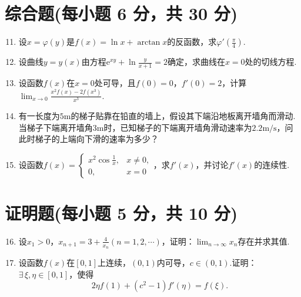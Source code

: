 \documentclass[../main.tex]{subfiles}
\begin{document}
\section{综合题(每小题 6 分，共 30 分)}
\begin{enumerate}
    \setcounter{enumi}{10}
    \item 设$x=\varphi(y)$是$f(x)=\ln x+\arctan x$的反函数，求$\varphi'\left
              (\frac{\pi}{4}\right)$.
          \vspace{10em}

    \item 设曲线$y=y(x)$由方程$\mathrm{e}^{xy}+\ln\frac{y}{x+1}=2$确定，求曲线在$x
              =0$处的切线方程.
          \vspace{10em}

    \item 设函数$f(x)$在$x=0$处可导，且$f(0)=0$，$f'(0)=2$，计算$\lim_{x\to0}
              \frac{x^{2}f(x)-2f(x^{3})}{x^{3}}$.
          \vspace{10em}

    \item 有一长度为$5\mathrm{m}$的梯子贴靠在铅直的墙上，假设其下端沿地板离开墙角而滑动.当梯子下端离开墙角$3
              \mathrm{m}$时，已知梯子的下端离开墙角滑动速率为$2.2\mathrm{m/s}$，问此时梯子的上端向下滑的速率为多少？
          \vspace{10em}

    \item 设函数$f(x)=
              \begin{cases}
                  x^{2}\cos\frac{1}{x}, & x\neq0, \\
                  0,                    & x=0
              \end{cases}$，求$f'(x)$，并讨论$f'(x)$的连续性.
          \vspace{12em}
\end{enumerate}

\section{证明题(每小题 5 分，共 10 分)}
\begin{enumerate}
    \setcounter{enumi}{15}
    \item 设$x_{1}>0$，$x_{n+1}=3+\frac{4}{x_{n}}(n=1,2,\cdots)$，证明：$\lim
              _{n\to\infty}x_{n}$存在并求其值.
          \vspace{12em}

    \item 设函数$f(x)$在$[0,1]$上连续，$(0,1)$内可导，$c\in(0,1)$.证明：$\exists
              \,\xi,\eta\in[0,1]$，使得
          \[
              2\eta f(1)+(c^{2}-1)f'(\eta)=f(\xi).
          \]
          \vspace{10em}
\end{enumerate}
\end{document}
